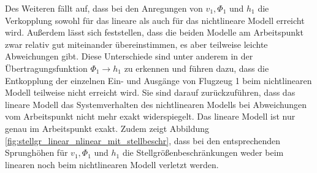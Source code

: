 Des Weiteren fällt auf, dass bei den Anregungen von $v_1, \Phi_1$ und $h_1$ die Verkopplung sowohl für das lineare als auch für das nichtlineare Modell erreicht wird. Außerdem lässt sich feststellen, dass die beiden Modelle am Arbeitspunkt zwar relativ gut miteinander übereinstimmen, es aber teilweise leichte Abweichungen gibt. Diese Unterschiede sind unter anderem in der Übertragungsfunktion $\Phi_1 \rightarrow h_1$ zu erkennen und führen dazu, dass die Entkopplung der einzelnen Ein- und Ausgänge von Flugzeug 1 beim nichtlinearen Modell teilweise nicht erreicht wird. Sie sind darauf zurückzuführen, dass das lineare Modell das Systemverhalten des nichtlinearen Modells bei Abweichungen vom Arbeitspunkt nicht mehr exakt widerspiegelt. Das lineare Modell ist nur genau im Arbeitspunkt exakt. Zudem zeigt Abbildung \ref{fig:stellgr_linear_nlinear_mit_stellbeschr}, dass bei den entsprechenden Sprunghöhen für $v_1, \Phi_1$ und $h_1$ die Stellgrößenbeschränkungen weder beim linearen noch beim nichtlinearen Modell verletzt werden. 

